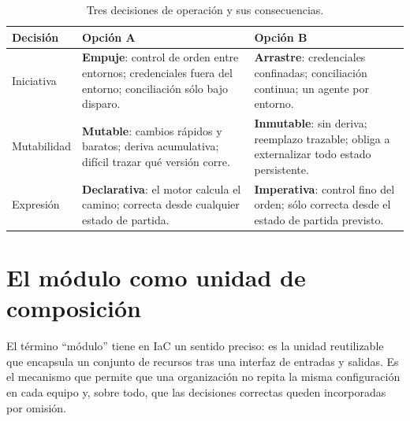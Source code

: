 \documentclass[11pt,letterpaper]{article}
\begin{document}
\begin{table}[!ht]
  \centering
  \footnotesize
  \caption{Tres decisiones de operación y sus consecuencias.}
  \label{tab:modos}
  \begin{tabularx}{\textwidth}{@{}>{\raggedright\arraybackslash}p{}
    >{\raggedright\arraybackslash}X>{\raggedright\arraybackslash}X@{}}
    \toprule
    \textbf{Decisión} & \textbf{Opción A} & \textbf{Opción B} \\
    \midrule
    Iniciativa &
      \textbf{Empuje}: control de orden entre entornos; credenciales fuera del
      entorno; conciliación sólo bajo disparo. &
      \textbf{Arrastre}: credenciales confinadas; conciliación continua;
      un agente por entorno. \\
    Mutabilidad &
      \textbf{Mutable}: cambios rápidos y baratos; deriva acumulativa; difícil
      trazar qué versión corre. &
      \textbf{Inmutable}: sin deriva; reemplazo trazable; obliga a externalizar
      todo estado persistente. \\
    Expresión &
      \textbf{Declarativa}: el motor calcula el camino; correcta desde
      cualquier estado de partida. &
      \textbf{Imperativa}: control fino del orden; sólo correcta desde el
      estado de partida previsto. \\
    \bottomrule
  \end{tabularx}
\end{table}

\section{El módulo como unidad de composición}

El término \enquote{módulo} tiene en IaC un sentido preciso: es la unidad
reutilizable que encapsula un conjunto de recursos tras una interfaz de
entradas y salidas. Es el mecanismo que permite que una organización no repita
la misma configuración en cada equipo y, sobre todo, que las decisiones
correctas queden incorporadas por omisión.
\end{document}
